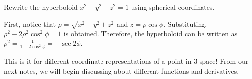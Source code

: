 \documentclass[../../../main.tex]{subfiles}
\begin{document}
\begin{problem}{}{}
Rewrite the hyperboloid $x^2 + y^2 - z^2 = 1$ using spherical
coordinates.
\end{problem}
\begin{solution}
First, notice that $\rho = \sqrt{x^2 + y^2 + z^2}$ and
$z = \rho\cos\phi$. Substituting, $\rho^2 - 2\rho^2\cos^2\phi = 1$
is obtained. Therefore, the hyperboloid can be written as
$\rho^2 = \frac{1}{1 - 2\cos^2\phi} = -\sec{2\phi}$.
\end{solution}

This is it for different coordinate representations of a point in
3-space! From our next notes, we will begin discussing about different
functions and derivatives.
\end{document}
